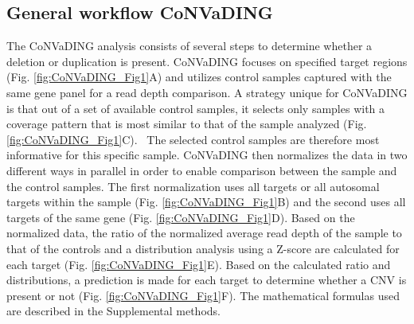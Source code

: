 \subsection{General workflow CoNVaDING}
The CoNVaDING analysis consists of several steps to determine whether a deletion or duplication is present. 
CoNVaDING focuses on specified target regions (Fig. \ref{fig:CoNVaDING_Fig1}A) and utilizes control samples captured with the same gene panel for a read depth comparison. 
A strategy unique for CoNVaDING is that out of a set of available control samples, it selects only samples with a coverage pattern that is most similar to that of the sample analyzed (Fig. \ref{fig:CoNVaDING_Fig1}C). \
The selected control samples are therefore most informative for this specific sample. 
CoNVaDING then normalizes the data in two different ways in parallel in order to enable comparison between the sample and the control samples. The first normalization uses all targets or all autosomal targets within the sample (Fig. \ref{fig:CoNVaDING_Fig1}B) and the second uses all targets of the same gene (Fig. \ref{fig:CoNVaDING_Fig1}D). 
Based on the normalized data, the ratio of the normalized average read depth of the sample to that of the controls and a distribution analysis using a Z-score are calculated for each target (Fig. \ref{fig:CoNVaDING_Fig1}E). 
Based on the calculated ratio and distributions, a prediction is made for each target to determine whether a CNV is present or not (Fig. \ref{fig:CoNVaDING_Fig1}F). 
The mathematical formulas used are described in the Supplemental methods.


